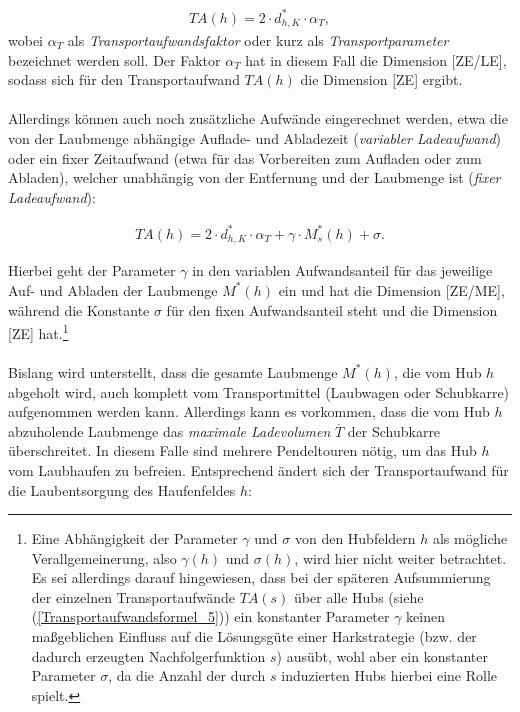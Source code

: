 \documentclass[fontsize=12pt,doubleside,openany,listof=totoc,listof=flat,listof=nochaptergap,numbers=noenddot]{scrbook}
\theoremstyle{style}
\begin{document}
\begin{align}
TA(h) = 2 \cdot d^*_{h,K} \cdot \alpha_T,
\label{Transportaufwandsformel_1}
\end{align}		
\noindent wobei $\alpha_T$ als \textit{Transportaufwandsfaktor}\label{Transportaufwandsfaktor} oder kurz als
\textit{Transportparameter} bezeichnet werden soll. Der Faktor $\alpha_T$ 
hat in diesem Fall die Dimension [ZE/LE], sodass sich für den 
Transportaufwand $TA(h)$ die Dimension [ZE] ergibt.
\\ \\
Allerdings können auch noch zusätzliche Aufwände eingerechnet werden, 
etwa die von der Laubmenge abhängige Auflade- und Abladezeit (\textit{variabler Ladeaufwand}\label{variabler Ladeaufwand}) oder ein 
fixer Zeitaufwand (etwa für das Vorbereiten zum Aufladen oder zum Abladen), 
welcher unabhängig von der Entfernung und der Laubmenge ist (\textit{fixer Ladeaufwand}\label{fixer Ladeaufwand}): 

\begin{align}
TA(h) = 2 \cdot d^*_{h,K} \cdot \alpha_T + \gamma \cdot M^*_s(h) + \sigma.\label{Transportaufwandsformel_2}
\end{align}

\noindent Hierbei geht der Parameter $\gamma$ in den variablen Aufwandsanteil für das 
jeweilige Auf- und Abladen der Laubmenge $M^*(h)$ ein und hat die Dimension [ZE/ME], während die Konstante $\sigma$ für den fixen Aufwandsanteil steht und die Dimension [ZE] hat.\footnote{Eine Abhängigkeit der Parameter $\gamma$ und $\sigma$ von den Hubfeldern $h$ als mögliche Verallgemeinerung, also $\gamma(h)$ und $\sigma(h)$, wird hier nicht weiter betrachtet. Es sei allerdings darauf hingewiesen, dass bei der späteren Aufsummierung der einzelnen Transportaufwände $TA(s)$ über alle Hubs (siehe (\ref{Transportaufwandsformel_5})) 
ein konstanter Parameter $\gamma$ keinen maßgeblichen Einfluss auf die Lösungsgüte einer Harkstrategie (bzw. der dadurch erzeugten Nachfolgerfunktion $s$) ausübt, wohl aber ein konstanter Parameter $\sigma$, da die Anzahl der durch $s$ induzierten Hubs hierbei eine Rolle spielt.}
\\ \\
Bislang wird unterstellt, dass die gesamte Laubmenge $M^*(h)$, die vom Hub $h$ 
abgeholt wird, auch komplett vom Transportmittel (Laubwagen oder Schubkarre) aufgenommen 
werden kann. Allerdings kann es vorkommen, dass die vom Hub $h$ 
abzuholende Laubmenge das \textit{maximale Ladevolumen}\label{Ladevolumen}
$\overline{T}$ der Schubkarre überschreitet. In diesem Falle sind mehrere
Pendeltouren nötig, um das Hub $h$ vom Laubhaufen zu befreien. Entsprechend
ändert sich der Transportaufwand für die Laubentsorgung des Haufenfeldes $h$:
\end{document}
